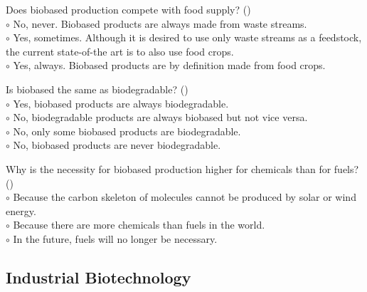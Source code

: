 \documentclass[]{beamer}
\begin{document}
\begin{CJK}{UTF8}{gbsn}
\begin{frame}[shrink] {} 
\addtocounter{questions}{1}
\color{blue}
  Does biobased production compete with food supply?
 ({})\\
\color{black}
\setlength{\parindent}{-0.4cm}
{\color{red}$\circ$} No, never. Biobased products are always made from waste streams.  \\
{\color{red}$\circ$}  Yes, sometimes. Although it is desired to use only waste streams as a feedstock, the current state-of-the art is to also use food crops.  \\
{\color{red}$\circ$} Yes, always. Biobased products are by definition made from food crops.  \\
\end{frame}


\begin{frame}[shrink] {} 
\addtocounter{questions}{1}
\color{blue}
  Is biobased the same as biodegradable?
 ({})\\
\color{black}
\setlength{\parindent}{-0.4cm}
{\color{red}$\circ$} Yes, biobased products are always biodegradable.  \\
{\color{red}$\circ$} No, biodegradable products are always biobased but not vice versa.  \\
{\color{red}$\circ$}  No, only some biobased products are biodegradable.  \\
{\color{red}$\circ$} No, biobased products are never biodegradable.  \\
\end{frame}


\begin{frame}[shrink] {} 
\addtocounter{questions}{1}
\color{blue}
  Why is the necessity for biobased production higher for chemicals than for fuels? 
 ({})\\
\color{black}
\setlength{\parindent}{-0.4cm}
{\color{red}$\circ$}  Because the carbon skeleton of molecules cannot be produced by solar or wind energy.   \\
{\color{red}$\circ$} Because there are more chemicals than fuels in the world.  \\
{\color{red}$\circ$} In the future, fuels will no longer be necessary.   \\
\end{frame}


\subsection{ Industrial Biotechnology}
\setcounter{questions}{0}



\end{CJK}
\end{document}
